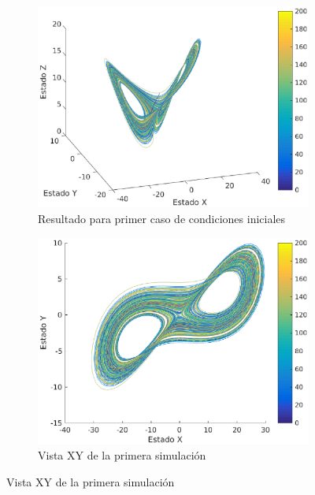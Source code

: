 \documentclass[12pt,letterpaper]{article}
\begin{document}
\begin{figure}
	\centering
	\begin{subfigure}[b]{0.36\textwidth}
		\includegraphics[width=\textwidth]{pictures/primera_simulacion}
		\caption{Resultado para primer caso de condiciones iniciales}
		\label{fig:simulacion1}
	\end{subfigure}
	\begin{subfigure}[b]{0.36\textwidth}
		\includegraphics[width=\textwidth]{pictures/primera_simulacion_xy}
		\caption{Vista XY de la primera simulación}
		\label{fig:simulacion1xy}

\end{subfigure}
\end{figure}
\end{document}
